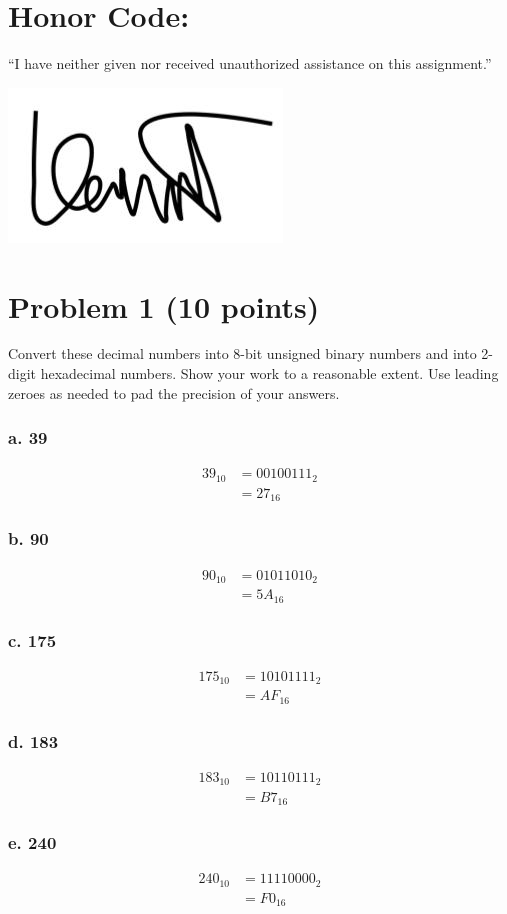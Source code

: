 \documentclass{article}
\begin{document}
\section*{Honor Code:}
\begin{center}
    “I have neither given nor received unauthorized assistance on this assignment.”
    
    \includegraphics[width = .1\textwidth]{Signature.jpg}
\end{center}
\section*{Problem 1 (10 points)}
Convert  these  decimal  numbers  into  8-bit  unsigned  binary  numbers  and  into  2-digit hexadecimal numbers. Show your work to a reasonable extent. Use leading zeroes as needed to pad the precision of your answers. 
\subsubsection*{a. 39}
\begin{align}
    39_{10} &= 00100111_2\\
    &= 27_{16}
\end{align}
\subsubsection*{b. 90}
\begin{align}
    90_{10} &= 01011010_2\\
    &= 5A_{16}
\end{align}
\subsubsection*{c. 175}
\begin{align}
    175_{10} &= 10101111_2\\
    &= AF_{16}
\end{align}
\subsubsection*{d. 183}
\begin{align}
    183_{10} &= 10110111_2\\
    &= B7_{16}
\end{align}
\subsubsection*{e. 240}
\begin{align}
    240_{10} &= 11110000_2\\
    &= F0_{16}
\end{align}
\newpage
\end{document}
